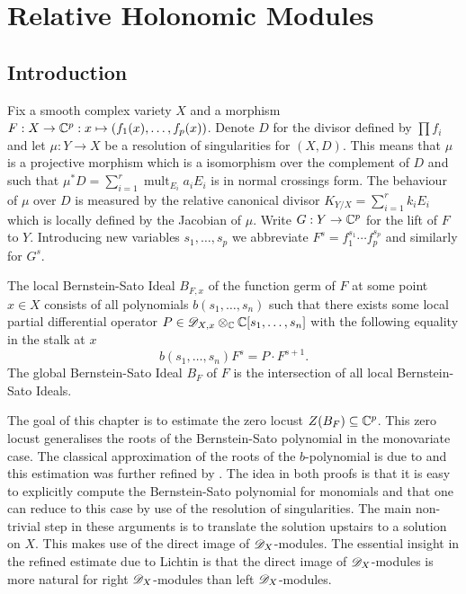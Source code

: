 \chapter{Relative Holonomic Modules}\label{ch: Chapter2}
\section{Introduction}\label{sec: IntoductionChapterRelative}
Fix a smooth complex variety $X$ and a morphism $F:X\to \mathbb{C}^p: x \mapsto (f_1(x), \ldots, f_p(x))$. Denote $D$ for the divisor defined by $\prod f_i$ and let $\mu:Y\to X$ be a resolution of singularities for $(X,D)$.
This means that $\mu$ is a projective morphism which is a isomorphism over the complement of $D$ and such that $\mu^*D = \sum_{i=1}^r \operatorname{mult}_{E_i} a_i E_i$ is in normal crossings form.
The behaviour of $\mu$ over $D$ is measured by the relative canonical divisor $K_{Y/X} = \sum_{i=1}^r k_i E_i$ which is locally defined by the Jacobian of $\mu$.
Write $G:Y\to \mathbb{C}^p$ for the lift of $F$ to $Y$.
Introducing new variables $s_1,\ldots,s_p$ we abbreviate $F^s= f_1^{s_1} \cdots f_p^{s_p}$ and similarly for $G^s$.


The local Bernstein-Sato Ideal $B_{F,x}$ of the function germ of $F$ at some point $x\in X$ consists of all polynomials $b(s_1,\ldots, s_n)$ such that there exists some local partial differential operator $P\in \mathscr{D}_{X,x}\otimes_{\mathbb{C}} \mathbb{C}[s_1,\ldots,s_n]$ with the following equality in the stalk at $x$
$$b(s_1,\ldots, s_n) F^s = P\cdot F^{s+1}.$$
The global Bernstein-Sato Ideal $B_F$ of $F$ is the intersection of all local Bernstein-Sato Ideals.

The goal of this chapter is to estimate the zero locust $Z(B_{F})\subseteq \mathbb{C}^p$.
This zero locust generalises the roots of the Bernstein-Sato polynomial in the monovariate case.
The classical approximation of the roots of the $b$-polynomial is due to \cite{kashiwara1976b} and this estimation was further refined by \cite{lichtin1989poles}.
The idea in both proofs is that it is easy to explicitly compute the Bernstein-Sato polynomial for monomials and that one can reduce to this case by use of the resolution of singularities.
The main non-trivial step in these arguments is to translate the solution upstairs to a solution on $X$.
This makes use of the direct image of $\mathscr{D}_X$-modules.
The essential insight in the refined estimate due to Lichtin is that the direct image of $\mathscr{D}_X$-modules is more natural for right $\mathscr{D}_X$-modules than left $\mathscr{D}_X$-modules.


